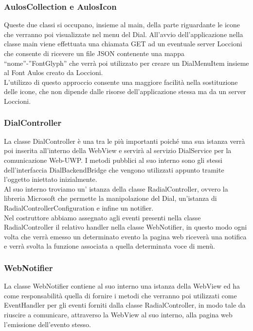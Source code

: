 \subsubsection{AulosCollection e AulosIcon}

Queste due classi si occupano, insieme al main, della parte riguardante le icone che verranno poi visualizzate nel menu del Dial. All’avvio dell’applicazione nella classe main viene effettuata una chiamata GET ad un eventuale server Loccioni che consente di ricevere un file JSON contenente una mappa “nome”-”FontGlyph” che verrà poi utilizzato per creare un DialMenuItem insieme al Font Aulos creato da Loccioni.\\

L’utilizzo di questo approccio consente una maggiore facilità nella sostituzione delle icone, che non dipende dalle risorse dell’applicazione stessa ma da un server Loccioni.

\subsubsection{DialController}

La classe DialController è una tra le più importanti poiché una sua istanza verrà poi inserita all’interno della WebView e servirà al servizio DialService per la comunicazione Web-UWP. I metodi pubblici al suo interno sono gli stessi dell’interfaccia DialBackendBridge che vengono utilizzati appunto tramite l’oggetto iniettato inizialmente.\\

Al suo interno troviamo un’ istanza della classe RadialController, ovvero la libreria Microsoft che permette la manipolazione del Dial, un'istanza di RadialControllerConfiguration e infine un notifier.\\

Nel costruttore abbiamo assegnato agli eventi presenti nella classe RadialController il relativo handler nella classe WebNotifier, in questo modo ogni volta che verrà emesso un determinato evento la pagina web riceverà una notifica e verrà svolta la funzione associata a quella determinata voce di menù.

\subsubsection{WebNotifier}

La classe WebNotifier contiene al suo interno una istanza della WebView ed ha come responsabilità quella di fornire i metodi che verranno poi utilizzati come EventHandler per gli eventi forniti dalla classe RadialController, in modo tale da riuscire a comunicare, attraverso la WebView al suo interno, alla pagina web l’emissione dell’evento stesso.\\


